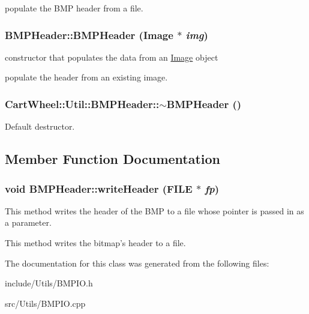 populate the BMP header from a file. \hypertarget{classCartWheel_1_1Util_1_1BMPHeader_a4632f2313cd1f0880ec9866792c83aad}{
\subsubsection[{BMPHeader}]{\setlength{\rightskip}{0pt plus 5cm}BMPHeader::BMPHeader ({\bf Image} $\ast$ {\em img})}}
\label{classCartWheel_1_1Util_1_1BMPHeader_a4632f2313cd1f0880ec9866792c83aad}
constructor that populates the data from an \hyperlink{classCartWheel_1_1Util_1_1Image}{Image} object

populate the header from an existing image. \hypertarget{classCartWheel_1_1Util_1_1BMPHeader_a74853e6cd6c446f6eb12c2793877695b}{
\subsubsection[{$\sim$BMPHeader}]{\setlength{\rightskip}{0pt plus 5cm}CartWheel::Util::BMPHeader::$\sim$BMPHeader ()}}
\label{classCartWheel_1_1Util_1_1BMPHeader_a74853e6cd6c446f6eb12c2793877695b}
Default destructor. 

\subsection{Member Function Documentation}
\hypertarget{classCartWheel_1_1Util_1_1BMPHeader_a13ced4b3edf1a2701ee0eaeb46d0430a}{
\subsubsection[{writeHeader}]{\setlength{\rightskip}{0pt plus 5cm}void BMPHeader::writeHeader (FILE $\ast$ {\em fp})}}
\label{classCartWheel_1_1Util_1_1BMPHeader_a13ced4b3edf1a2701ee0eaeb46d0430a}
This method writes the header of the BMP to a file whose pointer is passed in as a parameter.

This method writes the bitmap's header to a file. 

The documentation for this class was generated from the following files:\begin{DoxyCompactItemize}
\item 
include/Utils/BMPIO.h\item 
src/Utils/BMPIO.cpp\end{DoxyCompactItemize}

